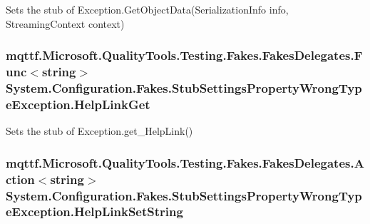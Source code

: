 Sets the stub of Exception.\-Get\-Object\-Data(\-Serialization\-Info info, Streaming\-Context context)

\hypertarget{class_system_1_1_configuration_1_1_fakes_1_1_stub_settings_property_wrong_type_exception_aad12eb60a9acdcf78c9095343baa8a41}{
\subsubsection[{Help\-Link\-Get}]{\setlength{\rightskip}{0pt plus 5cm}mqttf.\-Microsoft.\-Quality\-Tools.\-Testing.\-Fakes.\-Fakes\-Delegates.\-Func$<$string$>$ System.\-Configuration.\-Fakes.\-Stub\-Settings\-Property\-Wrong\-Type\-Exception.\-Help\-Link\-Get}}\label{class_system_1_1_configuration_1_1_fakes_1_1_stub_settings_property_wrong_type_exception_aad12eb60a9acdcf78c9095343baa8a41}


Sets the stub of Exception.\-get\-\_\-\-Help\-Link()

\hypertarget{class_system_1_1_configuration_1_1_fakes_1_1_stub_settings_property_wrong_type_exception_a25ebbb3d9488c783b06f75cdd3079585}{
\subsubsection[{Help\-Link\-Set\-String}]{\setlength{\rightskip}{0pt plus 5cm}mqttf.\-Microsoft.\-Quality\-Tools.\-Testing.\-Fakes.\-Fakes\-Delegates.\-Action$<$string$>$ System.\-Configuration.\-Fakes.\-Stub\-Settings\-Property\-Wrong\-Type\-Exception.\-Help\-Link\-Set\-String}}\label{class_system_1_1_configuration_1_1_fakes_1_1_stub_settings_property_wrong_type_exception_a25ebbb3d9488c783b06f75cdd3079585}


